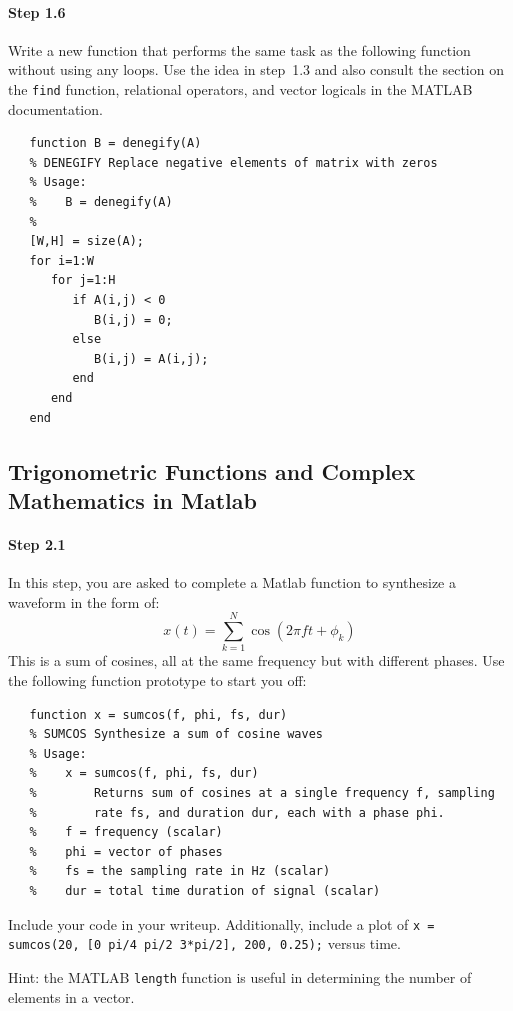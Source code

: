 \paragraph{Step 1.6} Write a new function that performs the same task
as the following function without using any loops. Use the idea in
step~1.3 and also consult the section on the \verb|find| function,
relational operators, and vector logicals in the MATLAB documentation.
\begin{verbatim}
   function B = denegify(A)
   % DENEGIFY Replace negative elements of matrix with zeros
   % Usage:
   %    B = denegify(A)
   %
   [W,H] = size(A);
   for i=1:W
      for j=1:H
         if A(i,j) < 0
            B(i,j) = 0;
         else
            B(i,j) = A(i,j);
         end
      end
   end
\end{verbatim}


\subsection{Trigonometric Functions and Complex Mathematics in Matlab}


\paragraph{Step 2.1} In this step, you are asked to complete a Matlab
function to synthesize a waveform in the form of:
\begin{equation*}
x(t) = \sum_{k=1}^N \cos(2\pi f t + \phi_k)
\end{equation*}
This is a sum of cosines, all at the same frequency but with different
phases.  Use the following function prototype to start you off:
\begin{verbatim}
   function x = sumcos(f, phi, fs, dur)
   % SUMCOS Synthesize a sum of cosine waves
   % Usage:
   %    x = sumcos(f, phi, fs, dur)
   %        Returns sum of cosines at a single frequency f, sampling
   %        rate fs, and duration dur, each with a phase phi.
   %    f = frequency (scalar)
   %    phi = vector of phases
   %    fs = the sampling rate in Hz (scalar)
   %    dur = total time duration of signal (scalar)
\end{verbatim}

Include your code in your writeup. Additionally, include a plot of
\texttt{x = sumcos(20, [0 pi/4 pi/2 3*pi/2], 200, 0.25);} versus
time.

Hint: the MATLAB \verb|length| function is useful in determining the
number of elements in a vector.


